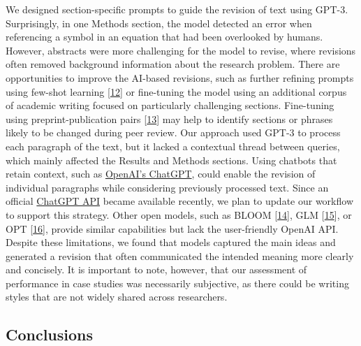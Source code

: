 \documentclass[
]{article}
\begin{document}
We designed section-specific prompts to guide the revision of text using GPT-3.
Surprisingly, in one Methods section, the model detected an error when referencing a symbol in an equation that had been overlooked by humans.
However, abstracts were more challenging for the model to revise, where revisions often removed background information about the research problem.
There are opportunities to improve the AI-based revisions, such as further refining prompts using few-shot learning {[}\protect\hyperlink{ref-S1Lim9f9}{12}{]} or fine-tuning the model using an additional corpus of academic writing focused on particularly challenging sections.
Fine-tuning using preprint-publication pairs {[}\protect\hyperlink{ref-WVt383GU}{13}{]} may help to identify sections or phrases likely to be changed during peer review.
Our approach used GPT-3 to process each paragraph of the text, but it lacked a contextual thread between queries, which mainly affected the Results and Methods sections.
Using chatbots that retain context, such as \href{https://openai.com/blog/chatgpt}{OpenAI's ChatGPT}, could enable the revision of individual paragraphs while considering previously processed text.
Since an official \href{https://openai.com/blog/introducing-chatgpt-and-whisper-apis}{ChatGPT API} became available recently, we plan to update our workflow to support this strategy.
Other open models, such as BLOOM {[}\protect\hyperlink{ref-I4d1F0yv}{14}{]}, GLM {[}\protect\hyperlink{ref-1GG6zItDi}{15}{]}, or OPT {[}\protect\hyperlink{ref-nEabcf28}{16}{]}, provide similar capabilities but lack the user-friendly OpenAI API.
Despite these limitations, we found that models captured the main ideas and generated a revision that often communicated the intended meaning more clearly and concisely.
It is important to note, however, that our assessment of performance in case studies was necessarily subjective, as there could be writing styles that are not widely shared across researchers.

\hypertarget{conclusions}{%
\subsection{Conclusions}\label{conclusions}}
\end{document}
